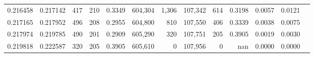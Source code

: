 \begin{tabular}{rrrrrrrrrrrrr}
0.216458 & 0.217142 &   417 & 210 &                                     0.3349 & 604,304 &   1,306 & 107,342 &     614 & 0.3198 & 0.0057 & 0.0121 \\
0.217165 & 0.217952 &   496 & 208 &                                     0.2955 & 604,800 &     810 & 107,550 &     406 & 0.3339 & 0.0038 & 0.0075 \\
0.217974 & 0.219785 &   490 & 201 &                                     0.2909 & 605,290 &     320 & 107,751 &     205 & 0.3905 & 0.0019 & 0.0030 \\
0.219818 & 0.222587 &   320 & 205 &                                     0.3905 & 605,610 &       0 & 107,956 &       0 &    nan & 0.0000 & 0.0000 \\
\bottomrule
\end{tabular}
